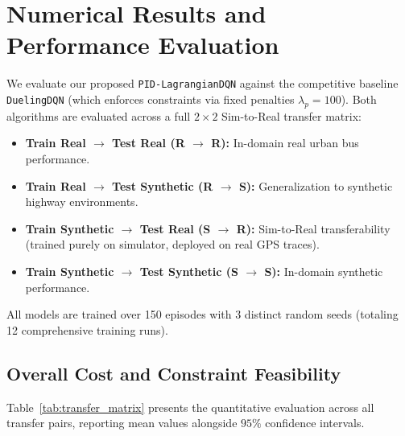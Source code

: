 \documentclass[12pt,a4paper]{article}
\begin{document}
\section{Numerical Results and Performance Evaluation}
\label{sec:numerical_results}

We evaluate our proposed \texttt{PID-LagrangianDQN} against the competitive baseline \texttt{DuelingDQN} (which enforces constraints via fixed penalties $\lambda_p = 100$). Both algorithms are evaluated across a full $2 \times 2$ Sim-to-Real transfer matrix:
\begin{itemize}
    \item \textbf{Train Real $\to$ Test Real (R $\to$ R):} In-domain real urban bus performance.
    \item \textbf{Train Real $\to$ Test Synthetic (R $\to$ S):} Generalization to synthetic highway environments.
    \item \textbf{Train Synthetic $\to$ Test Real (S $\to$ R):} Sim-to-Real transferability (trained purely on simulator, deployed on real GPS traces).
    \item \textbf{Train Synthetic $\to$ Test Synthetic (S $\to$ S):} In-domain synthetic performance.
\end{itemize}
All models are trained over 150 episodes with 3 distinct random seeds (totaling 12 comprehensive training runs).

\subsection{Overall Cost and Constraint Feasibility}
Table~\ref{tab:transfer_matrix} presents the quantitative evaluation across all transfer pairs, reporting mean values alongside $95\%$ confidence intervals.
\end{document}
